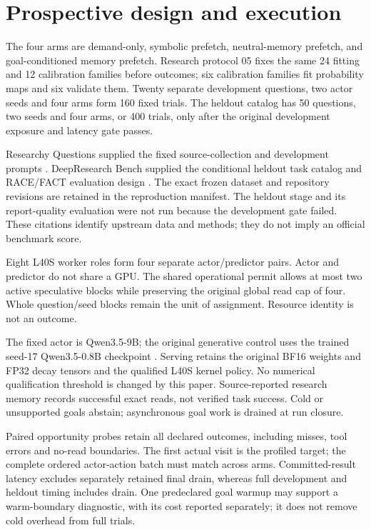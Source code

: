 \documentclass[10pt]{article}
\begin{document}
\hypertarget{prospective-design-and-execution}{%
\section{Prospective design and execution}\label{prospective-design-and-execution}}

The four arms are demand-only, symbolic prefetch, neutral-memory prefetch, and goal-conditioned memory prefetch. Research protocol 05 fixes the same 24 fitting and 12 calibration families before outcomes; six calibration families fit probability maps and six validate them. Twenty separate development questions, two actor seeds and four arms form 160 fixed trials. The heldout catalog has 50 questions, two seeds and four arms, or 400 trials, only after the original development exposure and latency gate passes.

Researchy Questions supplied the fixed source-collection and development prompts \citep{researchyquestions}. DeepResearch Bench supplied the conditional heldout task catalog and RACE/FACT evaluation design \citep{deepresearchbench}. The exact frozen dataset and repository revisions are retained in the reproduction manifest. The heldout stage and its report-quality evaluation were not run because the development gate failed. These citations identify upstream data and methods; they do not imply an official benchmark score.

Eight L40S worker roles form four separate actor/predictor pairs. Actor and predictor do not share a GPU. The shared operational permit allows at most two active speculative blocks while preserving the original global read cap of four. Whole question/seed blocks remain the unit of assignment. Resource identity is not an outcome.

The fixed actor is Qwen3.5-9B; the original generative control uses the trained seed-17 Qwen3.5-0.8B checkpoint \citep{qwenactor, qwenpredictor}. Serving retains the original BF16 weights and FP32 decay tensors and the qualified L40S kernel policy. No numerical qualification threshold is changed by this paper. Source-reported research memory records successful exact reads, not verified task success. Cold or unsupported goals abstain; asynchronous goal work is drained at run closure.

Paired opportunity probes retain all declared outcomes, including misses, tool errors and no-read boundaries. The first actual visit is the profiled target; the complete ordered actor-action batch must match across arms. Committed-result latency excludes separately retained final drain, whereas full development and heldout timing includes drain. One predeclared goal warmup may support a warm-boundary diagnostic, with its cost reported separately; it does not remove cold overhead from full trials.
\end{document}
